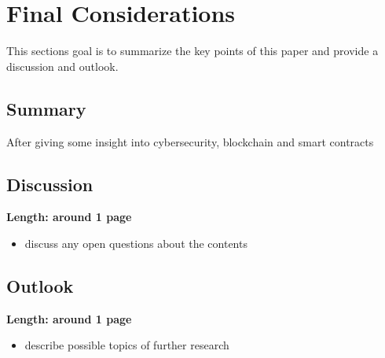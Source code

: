 \section{Final Considerations}

This sections goal is to summarize the key points of this paper and provide a discussion and outlook.
\subsection{Summary}

After giving some insight into cybersecurity, blockchain and smart contracts 


\subsection{Discussion}

\textbf{Length: around 1 page}

\begin{itemize}
  \item discuss any open questions about the contents
\end{itemize}

\subsection{Outlook}

\textbf{Length: around 1 page}

\begin{itemize}
  \item describe possible topics of further research
\end{itemize}
